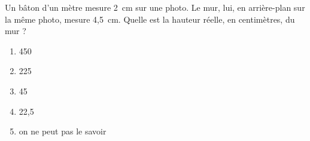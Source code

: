 Un bâton d'un mètre mesure 2~cm sur une photo. Le mur, lui, en arrière-plan sur la même photo, mesure 4,5~cm. Quelle est la hauteur réelle, en centimètres, du mur ?
\begin{multicols}{3}
  \begin{enumerate}[A/]
  \item 450
  \item 225
  \item 45
  \item 22,5
  \item on ne peut pas le savoir
  \end{enumerate}
\end{multicols}